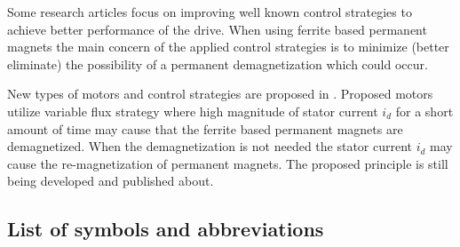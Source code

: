 \documentclass[a4paper, twoside, 11pt]{article}
\begin{document}
    \newpage
    Some research articles focus on improving well known control strategies to achieve better performance of the drive. When using ferrite based permanent magnets the main concern of the applied control strategies is to minimize (better eliminate) the possibility of a permanent demagnetization which could occur.\par
    New types of motors and control strategies are proposed in \cite{ostovic-Memory-motors-a-new-class-of-controllable-flux-PM-machines-for-a-true-wide-speed-operation}. Proposed motors utilize variable flux strategy where high magnitude of stator current $i_d$ for a short amount of time may cause that the ferrite based permanent magnets are demagnetized. When the demagnetization is not needed the stator current $i_d$ may cause the re-magnetization of permanent magnets. The proposed principle is still being developed and published about.


\flushbottom %


\newpage
\setmonofont{Times New Roman}

\printbibliography[title={{References}}]	
\nocite{*}
\setmonofont{CourierPrime-Regular}

\appendix
{}

\begin{appendices}
	\section{List of symbols and abbreviations}
    \vspace*{0.25cm}
		\printglossary[type=abbreviationslist, style = myStyleAbbreviations]

		\FloatBarrier
		\printglossary[type=symbolslist, style =  myStyleSymbols]

	\end{appendices}
\end{document}
